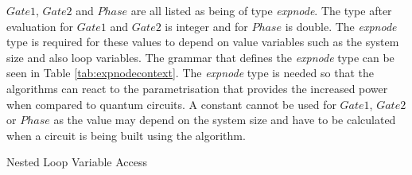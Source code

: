 $Gate1$, $Gate2$ and $Phase$ are all listed as being of type \emph{expnode}.
The type after evaluation for $Gate1$ and $Gate2$ is integer and for $Phase$ is double.
The \emph{expnode} type is required for these values to depend on value variables such as the system size and also loop variables.
The grammar that defines the \emph{expnode} type can be seen in Table \ref{tab:expnodecontext}.
The \emph{expnode} type is needed so that the algorithms can react to the parametrisation that provides the increased power when compared to quantum circuits.
A constant cannot be used for $Gate1$, $Gate2$ or $Phase$ as the value may depend on the system size and have to be calculated when a circuit is being built using the algorithm.

\begin{algorithm}
\begin{algorithmic}
\STATE {}
\STATE {}
\ENDFOR
\ENDFOR
\end{algorithmic}
\caption{Nested Loop Variable Access}
\label{alg:nestloopvars}
\end{algorithm}


